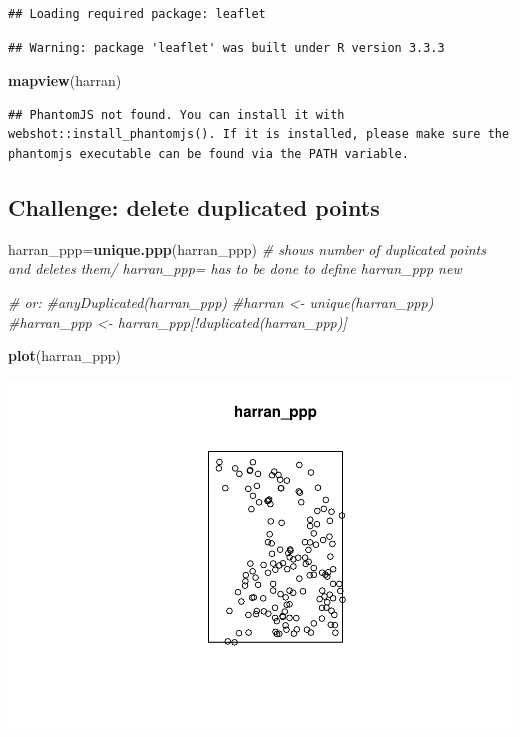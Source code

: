 \documentclass[]{article}
\newenvironment{Shaded}{\begin{snugshade}}{\end{snugshade}}
\newcommand{\KeywordTok}[1]{\textcolor[rgb]{0.13,0.29,0.53}{\textbf{{#1}}}}
\newcommand{\CommentTok}[1]{\textcolor[rgb]{0.56,0.35,0.01}{\textit{{#1}}}}
\newcommand{\NormalTok}[1]{{#1}}
\begin{document}
\begin{verbatim}
## Loading required package: leaflet
\end{verbatim}

\begin{verbatim}
## Warning: package 'leaflet' was built under R version 3.3.3
\end{verbatim}

\begin{Shaded}
\begin{Highlighting}[]
\KeywordTok{mapview}\NormalTok{(harran)}
\end{Highlighting}
\end{Shaded}

\begin{verbatim}
## PhantomJS not found. You can install it with webshot::install_phantomjs(). If it is installed, please make sure the phantomjs executable can be found via the PATH variable.
\end{verbatim}

\hypertarget{htmlwidget-64126c76b9d7ccca4d8d}{}

\subsection{Challenge: delete duplicated
points}\label{challenge-delete-duplicated-points}

\begin{Shaded}
\begin{Highlighting}[]
\NormalTok{harran_ppp=}\KeywordTok{unique.ppp}\NormalTok{(harran_ppp) }\CommentTok{# shows number of duplicated points and deletes them/ harran_ppp= has to be done to define harran_ppp new}


\CommentTok{# or:}
\CommentTok{#anyDuplicated(harran_ppp)}
\CommentTok{#harran <- unique(harran_ppp)}
\CommentTok{#harran_ppp <- harran_ppp[!duplicated(harran_ppp)]}

\KeywordTok{plot}\NormalTok{(harran_ppp)}
\end{Highlighting}
\end{Shaded}

\includegraphics{HarranPlain_files/figure-latex/unnamed-chunk-3-1.pdf}
\end{document}
